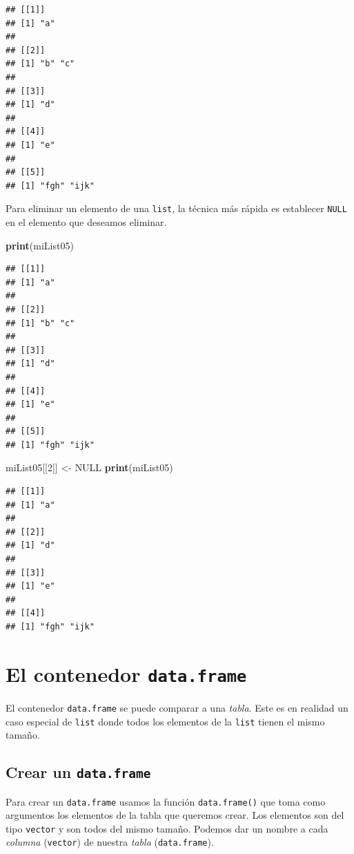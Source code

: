 \documentclass[]{book}
\newenvironment{Shaded}{\begin{snugshade}}{\end{snugshade}}
\newcommand{\KeywordTok}[1]{\textcolor[rgb]{0.13,0.29,0.53}{\textbf{#1}}}
\newcommand{\DecValTok}[1]{\textcolor[rgb]{0.00,0.00,0.81}{#1}}
\newcommand{\StringTok}[1]{\textcolor[rgb]{0.31,0.60,0.02}{#1}}
\newcommand{\OtherTok}[1]{\textcolor[rgb]{0.56,0.35,0.01}{#1}}
\newcommand{\NormalTok}[1]{#1}
\begin{document}
\begin{verbatim}
## [[1]]
## [1] "a"
## 
## [[2]]
## [1] "b" "c"
## 
## [[3]]
## [1] "d"
## 
## [[4]]
## [1] "e"
## 
## [[5]]
## [1] "fgh" "ijk"
\end{verbatim}

Para eliminar un elemento de una \texttt{list}, la técnica más rápida es
establecer \texttt{NULL} en el elemento que deseamos eliminar.

\begin{Shaded}
\begin{Highlighting}[]
\KeywordTok{print}\NormalTok{(miList05)}
\end{Highlighting}
\end{Shaded}

\begin{verbatim}
## [[1]]
## [1] "a"
## 
## [[2]]
## [1] "b" "c"
## 
## [[3]]
## [1] "d"
## 
## [[4]]
## [1] "e"
## 
## [[5]]
## [1] "fgh" "ijk"
\end{verbatim}

\begin{Shaded}
\begin{Highlighting}[]
\NormalTok{miList05[[}\DecValTok{2}\NormalTok{]] <-}\StringTok{ }\OtherTok{NULL}
\KeywordTok{print}\NormalTok{(miList05)}
\end{Highlighting}
\end{Shaded}

\begin{verbatim}
## [[1]]
## [1] "a"
## 
## [[2]]
## [1] "d"
## 
## [[3]]
## [1] "e"
## 
## [[4]]
## [1] "fgh" "ijk"
\end{verbatim}

\section{\texorpdfstring{El contenedor
\texttt{data.frame}}{El contenedor data.frame}}\label{el-contenedor-data.frame}

El contenedor \texttt{data.frame} se puede comparar a una \emph{tabla}.
Este es en realidad un caso especial de \texttt{list} donde todos los
elementos de la \texttt{list} tienen el mismo tamaño.

\subsection{\texorpdfstring{Crear un
\texttt{data.frame}}{Crear un data.frame}}\label{crear-un-data.frame}

Para crear un \texttt{data.frame} usamos la función
\texttt{data.frame()} que toma como argumentos los elementos de la tabla
que queremos crear. Los elementos son del tipo \texttt{vector} y son
todos del mismo tamaño. Podemos dar un nombre a cada \emph{columna}
(\texttt{vector}) de nuestra \emph{tabla} (\texttt{data.frame}).
\end{document}
